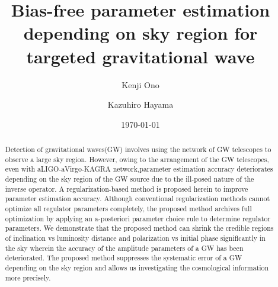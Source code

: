 \documentclass[%
 aps,
 prd,
 amsmath,amssymb,
 reprint,%
superscriptaddress
]{revtex4-1}
\begin{document}
\title[regularization study]{Bias-free parameter estimation depending on sky region for targeted gravitational wave}%

\author{Kenji Ono}%
%
%

\author{Kazuhiro Hayama}
%

%
\date{\today}%

\begin{abstract}
Detection of gravitational waves(GW) involves using the network of GW telescopes to observe a large sky region. However, owing to the arrangement of the GW telescopes, even with aLIGO-aVirgo-KAGRA network,parameter estimation accuracy deteriorates depending on the sky region of the GW source due to the ill-posed nature of the inverse operator. A regularization-based method is proposed herein to improve parameter estimation accuracy. Although conventional regularization methods cannot optimize all regulator parameters completely, the proposed method archives full optimization by applying an a-posteriori parameter choice rule to determine regulator parameters. We demonstrate that the proposed method can shrink the credible regions of inclination vs luminosity distance and polarization vs initial phase significantly in the sky wherein the accuracy of the amplitude parameters of a GW has been deteriorated. The proposed method suppresses the systematic error of a GW depending on the sky region and allows us investigating the cosmological information more precisely.

\end{abstract}
\end{document}
